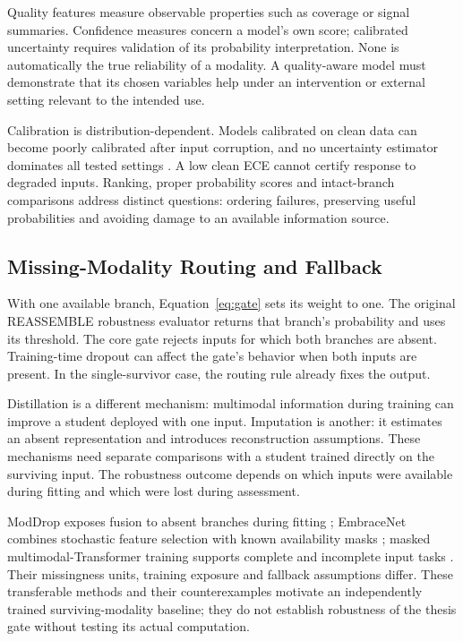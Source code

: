 Quality features measure observable properties such as coverage or signal summaries. Confidence measures concern a model's own score; calibrated uncertainty requires validation of its probability interpretation. None is automatically the true reliability of a modality. A quality-aware model must demonstrate that its chosen variables help under an intervention or external setting relevant to the intended use.

Calibration is distribution-dependent. Models calibrated on clean data can become poorly calibrated after input corruption, and no uncertainty estimator dominates all tested settings \citep{P008}. A low clean ECE cannot certify response to degraded inputs. Ranking, proper probability scores and intact-branch comparisons address distinct questions: ordering failures, preserving useful probabilities and avoiding damage to an available information source.

\subsection{Missing-Modality Routing and Fallback}
With one available branch, Equation~\ref{eq:gate} sets its weight to one. The original REASSEMBLE robustness evaluator returns that branch's probability and uses its threshold. The core gate rejects inputs for which both branches are absent. Training-time dropout can affect the gate's behavior when both inputs are present. In the single-survivor case, the routing rule already fixes the output.

Distillation is a different mechanism: multimodal information during training can improve a student deployed with one input. Imputation is another: it estimates an absent representation and introduces reconstruction assumptions. These mechanisms need separate comparisons with a student trained directly on the surviving input. The robustness outcome depends on which inputs were available during fitting and which were lost during assessment.

ModDrop exposes fusion to absent branches during fitting \citep{P005}; EmbraceNet combines stochastic feature selection with known availability masks \citep{P007}; masked multimodal-Transformer training supports complete and incomplete input tasks \citep{P016}. Their missingness units, training exposure and fallback assumptions differ. These transferable methods and their counterexamples motivate an independently trained surviving-modality baseline; they do not establish robustness of the thesis gate without testing its actual computation.

